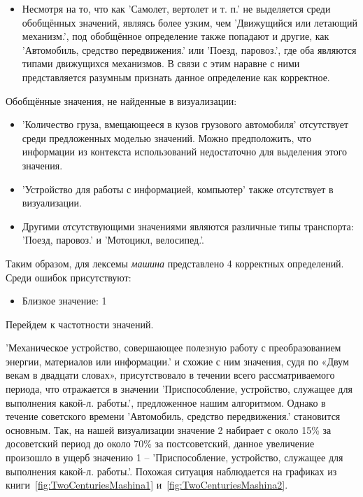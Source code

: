 \begin{itemize}
    \item Несмотря на то, что как ’Самолет, вертолет и т. п.’ не выделяется среди
обобщённых значений, являясь более узким, чем ’Движущийся или летающий механизм.’,
под обобщённое определение также попадают и другие, как ’Автомобиль, средство передвижения.’
или ’Поезд, паровоз.’, где оба являются типами движущихся механизмов.
В связи с этим наравне с ними представляется разумным признать данное определение как корректное.

\end{itemize}

Обобщённые значения, не найденные в визуализации:
\begin{itemize}
    \item ’Количество груза, вмещающееся в кузов грузового автомобиля’ отсутствует среди предложенных моделью значений.
Можно предположить, что информации из контекста использований недостаточно для выделения этого значения.

    \item ’Устройство для работы с информацией, компьютер’ также отсутствует в визуализации.

    \item Другими отсутствующими значениями являются различные типы транспорта:
’Поезд, паровоз.’ и ’Мотоцикл, велосипед.’.   %
\end{itemize}

Таким образом, для лексемы \textit{машина} представлено 4 корректных определений.
Среди ошибок присутствуют:
\begin{itemize}
    \item Близкое значение: 1
\end{itemize}

Перейдем к частотности значений.

’Механическое устройство, совершающее полезную работу с преобразованием энергии,
материалов или информации.’ и схожие с ним значения, судя по «Двум векам в двадцати словах»,
присутствовало в течении всего рассматриваемого периода, что отражается в значении
’Приспособление, устройство, служащее для выполнения какой-л. работы.’, предложенное
нашим алгоритмом.
Однако в течение советского времени ’Автомобиль, средство передвижения.’ становится основным.
Так, на нашей визуализации значение 2 набирает с около 15\% за досоветский период
до около 70\% за постсоветский, данное увеличение произошло в ущерб значению 1 –
’Приспособление, устройство, служащее для выполнения какой-л. работы.’.
Похожая ситуация наблюдается на графиках из книги~\ref{fig:TwoCenturiesMashina1} и~\ref{fig:TwoCenturiesMashina2}.

